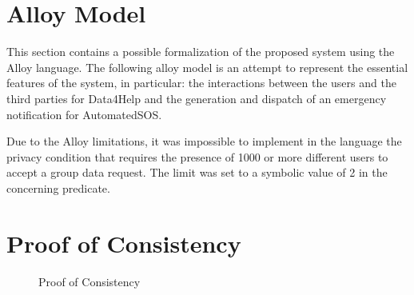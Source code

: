 \section{Alloy Model}
This section contains a possible formalization of the proposed system using the Alloy language.
The following alloy model is an attempt to represent the essential features of the system, in particular: the interactions between the users and the third parties for Data4Help and the generation and dispatch of an emergency notification for AutomatedSOS.
\par Due to the Alloy limitations, it was impossible to implement in the language the privacy condition that requires the presence of 1000 or more different users to accept a group data request. The limit was set to a symbolic value of 2 in the concerning predicate. \\



\section{Proof of Consistency}
\begin{figure}[H]
    \renewcommand{\thefigure}{\alph{figure}}
    \captionsetup{labelformat=parens, labelsep=space, name=}
    \caption{Proof of Consistency}
\end{figure}


